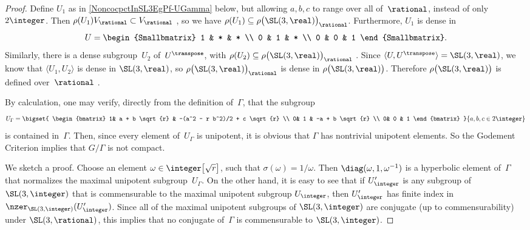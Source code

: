 \begin{proof}
Define $U_1$ as in \eqref{NoncocpctInSL3EgPf-UGamma} below, %
but allowing $a,b,c$ to range over all of~$\rational$, instead
of only~$2\integer$. Then $\rho(U_1) V_{\rational} \subset
V_{\rational}$ , so we have $\rho(U_1)
\subseteq \rho \bigl( \SL(3,\real) \bigr)_{\rational}$.
Furthermore, $U_1$ is dense in
 $$ U = 
 \begin{Smallbmatrix}
 1 & * & * \\
 0 & 1 & * \\
 0 & 0 & 1 
 \end{Smallbmatrix}
 .$$
 Similarly, there is a dense subgroup~$U_2$
of~$U^\transpose$, with $\rho(U_2) \subseteq \rho \bigl(
\SL(3,\real) \bigr)_{\rational}$
. Since $\langle U, U^\transpose
\rangle = \SL(3,\real)$, we know that $\langle U_1,U_2
\rangle$ is dense in $\SL(3,\real)$, so $\rho \bigl(
\SL(3,\real) \bigr)_{\rational}$ is dense in $\rho \bigl(
\SL(3,\real) \bigr)$. Therefore $\rho \bigl( \SL(3,\real)
\bigr)$ is defined over~$\rational$ .

 By calculation, one may verify, directly from the
definition of~$\Gamma$, that the subgroup
 \begin{equation} \label{NoncocpctInSL3EgPf-UGamma}
 U_\Gamma = \bigset{
 \begin{bmatrix}
 1& a + b \sqrt{r} & -(a^2 - r b^2)/2 + c \sqrt{r} \\
 0& 1                 &  -a + b \sqrt{r} \\
 0& 0                 & 1 
 \end{bmatrix}
 } { a,b,c \in 2 \integer }
 \end{equation}
 is contained in~$\Gamma$. Then, since every element
of~$U_\Gamma$ is unipotent, it is obvious that $\Gamma$ has
nontrivial unipotent elements. So the Godement Criterion
 implies that $G/\Gamma$
is not compact.

We sketch a proof. Choose an element $\omega \in \integer \bigl[ \sqrt{r} \bigr]$, such that $\sigma(\omega) = 1/\omega$. Then $\diag(\omega, 1, \omega^{-1})$ is a hyperbolic element of~$\Gamma$ that normalizes the maximal unipotent subgroup~$U_\Gamma$. On the other hand, it is easy to see that if $U'_\integer$ is any subgroup of $\SL(3,\integer)$ that is commensurable to the maximal unipotent subgroup $U_\integer$, then $U'_\integer$ has finite index in $\nzer_{\SL(3,\integer)}(U'_\integer)$. Since all of the maximal unipotent subgroups of $\SL(3,\integer)$ are conjugate (up to commensurability) under $\SL(3,\rational)$, this implies that  no conjugate of~$\Gamma$ is commensurable to $\SL(3,\integer)$.


\end{proof}
